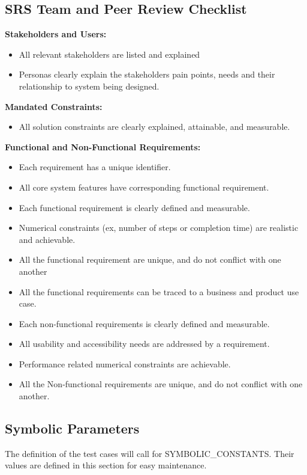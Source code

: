 \documentclass[12pt, titlepage]{article}
\begin{document}
\subsection{SRS Team and Peer Review Checklist}
\label{appendix:srs_checklist}
\textbf{Stakeholders and Users:}
\begin{itemize}
  \item All relevant stakeholders are listed and explained
  \item  Personas clearly explain the stakeholders pain points, needs and their relationship to system being designed. 
\end{itemize}
\textbf{Mandated Constraints:}
\begin{itemize}
  \item All solution constraints are clearly explained, attainable, and measurable. 
\end{itemize}
\textbf{Functional and Non-Functional Requirements:}
\begin{itemize}
  \item Each requirement has a unique identifier.
  \item All core system features have corresponding functional requirement.
  \item Each functional requirement is clearly defined and measurable.
  \item Numerical constraints (ex, number of steps or completion time) are realistic and achievable. 
  \item All the functional requirement are unique, and do not conflict with one another 
  \item All the functional requirements can be traced to a business and product use case.
  \item Each non-functional requirements is clearly defined and measurable. 
  \item All usability and accessibility needs are addressed by a requirement.
  \item Performance related numerical constraints are achievable. 
  \item All the Non-functional requirements are unique, and do not conflict with one another. 
\end{itemize}


\subsection{Symbolic Parameters}

The definition of the test cases will call for SYMBOLIC\_CONSTANTS.
Their values are defined in this section for easy maintenance.
\end{document}
